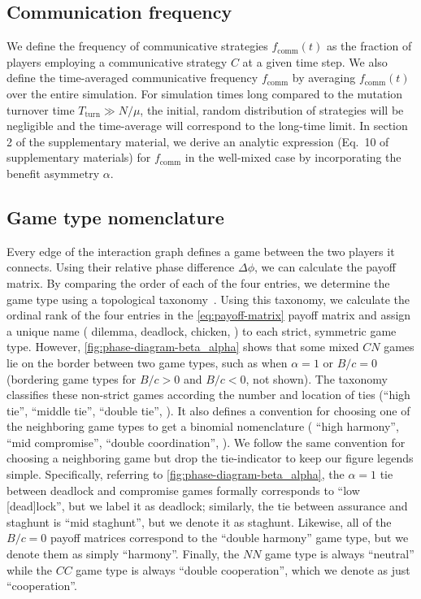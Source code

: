 \documentclass[pdflatex,twocolumn,sn-nature,super]{sn-jnl}
\begin{document}
\subsection{Communication frequency}
We define the frequency of communicative strategies
$f_{\text{comm}}(t)$ as the fraction of players employing
a communicative strategy $C$ at a given time step.
We also define the time-averaged communicative frequency
$f_{\text{comm}}$
by averaging $f_{\text{comm}}(t)$ over the entire simulation.
For simulation times long compared to the mutation turnover time
$T_{\text{turn}} \gg N/\mu$,
the initial, random distribution of strategies will be negligible
and the time-average will correspond to the long-time limit.
In section 2 of the supplementary material,
we derive an analytic expression (Eq.\ 10 of supplementary materials) for
$f_{\text{comm}}$ in the well-mixed case
by incorporating the benefit asymmetry $\alpha$.

\subsection{Game type nomenclature}
\label{sec:game-type-nomenclature}
Every edge of the interaction graph
defines a game between the two players it connects.
Using their relative phase difference $\Delta \phi$,
we can calculate the payoff matrix.
By comparing the order of each of the four entries,
we determine the game type using
a topological taxonomy~\citep{bruns2015names}.
Using this taxonomy, we calculate the ordinal rank of the four entries
in the \cref{eq:payoff-matrix} payoff matrix
and assign a unique name (\eg{} dilemma, deadlock, chicken, \etc{})
to each strict, symmetric game type.
However, \cref{fig:phase-diagram-beta_alpha}
shows that some mixed $CN$ games lie on the border between two game types,
such as when $\alpha = 1$ or $B/c = 0$
(bordering game types for $B/c > 0$ and $B/c < 0$, not shown).
The taxonomy~\citep{bruns2015names} classifies these non-strict games
according the number and location of ties (``high tie'', ``middle tie'',
``double tie'', \etc{}).
It also defines a convention for choosing one of the neighboring game types
to get a binomial nomenclature (\eg{} ``high harmony'', ``mid compromise'',
``double coordination'', \etc{}).
We follow the same convention for choosing a neighboring game
but drop the tie-indicator to keep our figure legends simple.
Specifically, referring to \cref{fig:phase-diagram-beta_alpha},
the $\alpha = 1$ tie between deadlock and compromise games
formally corresponds to ``low [dead]lock'',
but we label it as deadlock;
similarly, the tie between assurance and staghunt
is ``mid staghunt'', but we denote it as staghunt.
Likewise, all of the $B/c = 0$ payoff matrices
correspond to the ``double harmony'' game type,
but we denote them as simply ``harmony''.
Finally, the $NN$ game type is always ``neutral''
while the $CC$ game type is always ``double cooperation'',
which we denote as just ``cooperation''.
\end{document}

